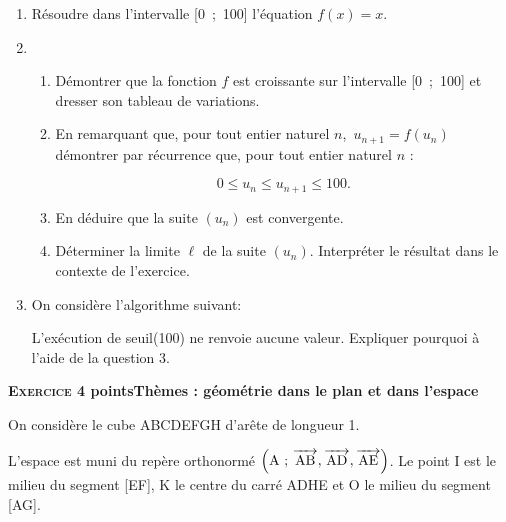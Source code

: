 \documentclass[11pt]{article}
\newcommand{\vect}[1]{\overrightarrow{\,\mathstrut#1\,}}
\begin{document}
\begin{enumerate}[resume]
\item Résoudre dans l'intervalle [0~;~100] l'équation $f(x) = x$.
\item
	\begin{enumerate}
		\item Démontrer que la fonction $f$ est croissante sur l'intervalle [0~;~100] et dresser son tableau de variations.
		\item En remarquant que, pour tout entier naturel $n$,\, $u_{n+1} = f\left(u_n\right)$ démontrer par récurrence que, pour tout entier naturel $n$ :

\[0 \leqslant u_n \leqslant u_{n+1} \leqslant 100.\]

		\item En déduire que la suite $\left(u_n\right)$ est convergente.
		\item Déterminer la limite $\ell$ de la suite $\left(u_n\right)$. Interpréter le résultat dans le contexte de l'exercice.
	\end{enumerate}
\item On considère l'algorithme suivant:

\begin{center}
\end{center}

L'exécution de seuil(100) ne renvoie aucune valeur. Expliquer pourquoi à l'aide de la question 3.
\end{enumerate}

\bigskip

\textbf{\textsc{Exercice 4}  points\hfill Thèmes : géométrie dans le plan et dans l'espace}

\medskip

On considère le cube ABCDEFGH d'arête de longueur 1.

L'espace est muni du repère orthonormé $\left(\text{A}~;\, \vect{\text{AB}}, \vect{\text{AD}}, \vect{\text{AE}}\right)$. Le point I est le milieu du
segment [EF], K le centre du carré ADHE et O le milieu du segment [AG].
\end{document}
